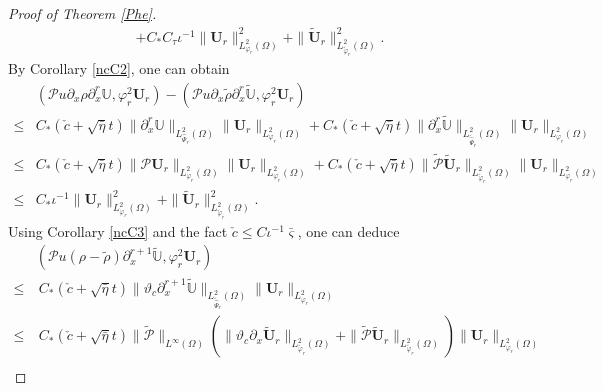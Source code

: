 \documentclass[10pt,a4paper]{amsart}
\begin{document}
\begin{proof}[Proof of Theorem \ref{Phe}]
\begin{align}
     +C_{*}C_{\tau}\iota^{-1}\|\mathbf{U}_{r}\|_{L_{\varphi_{r}}^{2}(\Omega)}^{2}
     +\|\tilde{\mathbf{U}}_{r}\|_{L_{\tilde{\varphi}_{r}}^{2}(\Omega)}^{2}.\nonumber
\end{align}
By Corollary \ref{ncC2}, one can obtain
\begin{align}\label{JJ112}
&(\mathcal{P}u\partial_{x}\rho\partial_{x}^{r}\mathbb{U},\varphi_{r}^{2}\mathbf{U}_{r})
-(\mathcal{P}u\partial_{x}\tilde{\rho}\partial_{x}^{r}\tilde{\mathbb{U}},\varphi_{r}^{2}\mathbf{U}_{r})\\
\leq& C_{*}(\check{c}+\sqrt{\bar{\eta}}t)\|\partial_{x}^{r}\mathbb{U}\|_{L_{\hat{\Psi}_{r}}^{2}(\Omega)}
                                             \|\mathbf{U}_{r}\|_{L_{\varphi_{r}}^{2}(\Omega)}
     +C_{*}(\check{c}+\sqrt{\bar{\eta}}t)\|\partial_{x}^{r}\tilde{\mathbb{U}}\|_{L_{\tilde{\hat{\Psi}}_{r}}^{2}(\Omega)}
                                             \|\mathbf{U}_{r}\|_{L_{\varphi_{r}}^{2}(\Omega)}\nonumber\\
\leq& C_{*}(\check{c}+\sqrt{\bar{\eta}}t)\|\mathcal{P}\mathbf{U}_{r}\|_{L_{\varphi_{r}}^{2}(\Omega)}
                                             \|\mathbf{U}_{r}\|_{L_{\varphi_{r}}^{2}(\Omega)}
     +C_{*}(\check{c}+\sqrt{\bar{\eta}}t)\|\tilde{\mathcal{P}}\tilde{\mathbf{U}}_{r}\|_{L_{\tilde{\varphi}_{r}}^{2}(\Omega)}
                                             \|\mathbf{U}_{r}\|_{L_{\varphi_{r}}^{2}(\Omega)}\nonumber\\
\leq& C_{*}\iota^{-1}\|\mathbf{U}_{r}\|_{L_{\varphi_{r}}^{2}(\Omega)}^{2}
     +\|\tilde{\mathbf{U}}_{r}\|_{L_{\tilde{\varphi}_{r}}^{2}(\Omega)}^{2}.\nonumber
\end{align}
Using Corollary \ref{ncC3} and the fact $\check{c}\leq C\iota^{-1}\bar{\varsigma}$, one can deduce
\begin{align}\label{JJ113}
&(\mathcal{P}u(\rho-\tilde{\rho})\partial_{x}^{r+1}\tilde{\mathbb{U}},\varphi_{r}^{2}\mathbf{U}_{r})\\
\leq&~C_{*}(\check{c}+\sqrt{\bar{\eta}}t)
           \|\vartheta_{c}\partial_{x}^{r+1}\tilde{\mathbb{U}}\|_{L_{\tilde{\hat{\Psi}}_{r}}^{2}(\Omega)}
           \|\mathbf{U}_{r}\|_{L_{\varphi_{r}}^{2}(\Omega)}\nonumber\\
\leq&~C_{*}(\check{c}+\sqrt{\bar{\eta}}t)\|\tilde{\mathcal{P}}\|_{L^{\infty}(\Omega)}
           \left(\|\vartheta_{c}\partial_{x}\tilde{\mathbf{U}}_{r}\|_{L_{\tilde{\varphi}_{r}}^{2}(\Omega)}
                 +\|\tilde{\mathcal{P}}\tilde{\mathbf{U}}_{r}\|_{L_{\tilde{\varphi}_{r}}^{2}(\Omega)}\right)
      \|\mathbf{U}_{r}\|_{L_{\varphi_{r}}^{2}(\Omega)}\nonumber\\

\end{align}
\end{proof}
\end{document}
